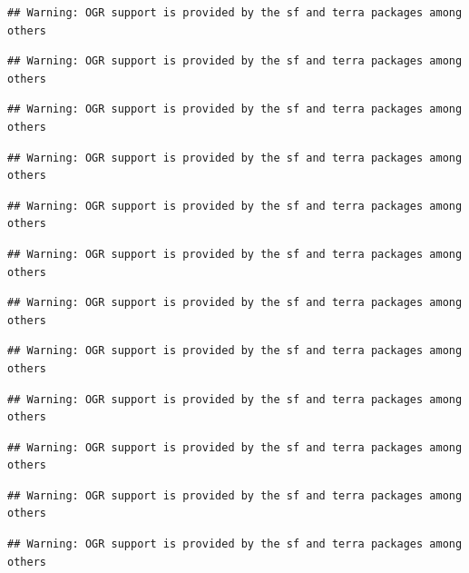 \documentclass[
]{book}
\begin{document}
\begin{verbatim}
## Warning: OGR support is provided by the sf and terra packages among others
\end{verbatim}

\begin{verbatim}
## Warning: OGR support is provided by the sf and terra packages among others
\end{verbatim}

\begin{verbatim}
## Warning: OGR support is provided by the sf and terra packages among others
\end{verbatim}

\begin{verbatim}
## Warning: OGR support is provided by the sf and terra packages among others
\end{verbatim}

\begin{verbatim}
## Warning: OGR support is provided by the sf and terra packages among others
\end{verbatim}

\begin{verbatim}
## Warning: OGR support is provided by the sf and terra packages among others
\end{verbatim}

\begin{verbatim}
## Warning: OGR support is provided by the sf and terra packages among others
\end{verbatim}

\begin{verbatim}
## Warning: OGR support is provided by the sf and terra packages among others
\end{verbatim}

\begin{verbatim}
## Warning: OGR support is provided by the sf and terra packages among others
\end{verbatim}

\begin{verbatim}
## Warning: OGR support is provided by the sf and terra packages among others
\end{verbatim}

\begin{verbatim}
## Warning: OGR support is provided by the sf and terra packages among others
\end{verbatim}

\begin{verbatim}
## Warning: OGR support is provided by the sf and terra packages among others
\end{verbatim}
\end{document}
